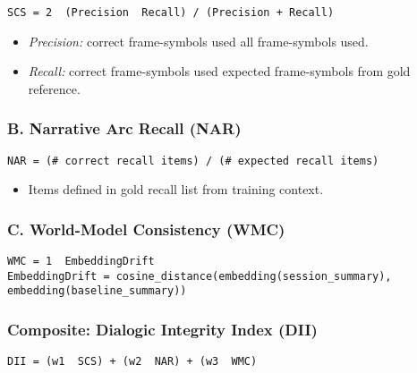 \documentclass{article}
\begin{document}
\begin{verbatim}
SCS = 2  (Precision  Recall) / (Precision + Recall)
\end{verbatim}

\begin{itemize}
\item
  \emph{Precision:} correct frame-symbols used all frame-symbols used.
\item
  \emph{Recall:} correct frame-symbols used expected frame-symbols from gold reference.
\end{itemize}

\subsubsection*{B. Narrative Arc Recall (NAR)}\label{b.-narrative-arc-recall-nar}

\begin{verbatim}
NAR = (# correct recall items) / (# expected recall items)
\end{verbatim}

\begin{itemize}
\tightlist
\item
  Items defined in gold recall list from training context.
\end{itemize}

\subsubsection*{C. World-Model Consistency (WMC)}\label{c.-world-model-consistency-wmc}

\begin{verbatim}
WMC = 1  EmbeddingDrift
EmbeddingDrift = cosine_distance(embedding(session_summary), embedding(baseline_summary))
\end{verbatim}

\subsubsection*{Composite: Dialogic Integrity Index (DII)}\label{composite-dialogic-integrity-index-dii}

\begin{verbatim}
DII = (w1  SCS) + (w2  NAR) + (w3  WMC)
\end{verbatim}
\end{document}

